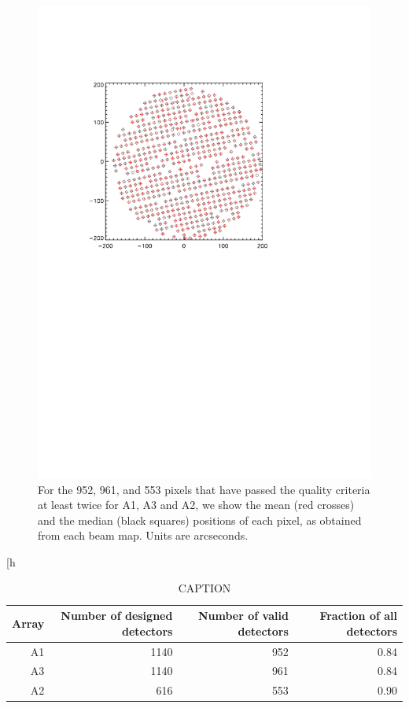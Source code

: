 \begin{figure}[htp]
\begin{center}
\includegraphics[trim=2cm 14cm 5cm 4cm, clip=true,width=0.6\linewidth]{Figures/A2_test_positions.pdf}
\caption{For the 952, 961, and 553 pixels that
  have passed the quality criteria at least twice for A1, A3 and A2,
  we show the mean (red crosses) and the median (black squares)
  positions of each pixel, as obtained from each beam map.
  Units are arcseconds. }
\label{fig:mean_vs_median}
\end{center}
\end{figure}


\begin{table}[h
  \label{tab:number_of_kids}
  \begin{tabular}{|r|r|r|r|}
    \hline
    Array & Number of designed detectors &  Number of valid detectors & Fraction of all detectors\\
    \hline
    A1 & 1140 & 952 &  0.84\\
    A3 & 1140 & 961 &  0.84\\
    A2 & 616  & 553 &  0.90\\
    \hline
  \end{tabular}
  \caption{ CAPTION}
  \label{tab:nbkids}
\end{table}
